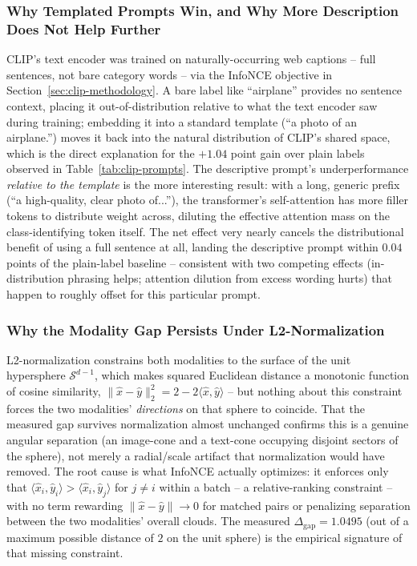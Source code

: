 \subsubsection{Why Templated Prompts Win, and Why More Description Does Not Help Further}

CLIP's text encoder was trained on naturally-occurring web captions --
full sentences, not bare category words -- via the InfoNCE objective in
Section~\ref{sec:clip-methodology}. A bare label like ``airplane'' provides no sentence context,
placing it out-of-distribution relative to what the text encoder saw
during training; embedding it into a standard template
(``a photo of an airplane.'') moves it back into the natural distribution
of CLIP's shared space, which is the direct explanation for the $+1.04$
point gain over plain labels observed in Table~\ref{tab:clip-prompts}. The
descriptive prompt's underperformance \emph{relative to the template} is
the more interesting result: with a long, generic prefix (``a
high-quality, clear photo of...''), the transformer's self-attention has
more filler tokens to distribute weight across, diluting the effective
attention mass on the class-identifying token itself. The net effect very
nearly cancels the distributional benefit of using a full sentence at all,
landing the descriptive prompt within $0.04$ points of the plain-label
baseline -- consistent with two competing effects (in-distribution
phrasing helps; attention dilution from excess wording hurts) that happen
to roughly offset for this particular prompt.

\subsubsection{Why the Modality Gap Persists Under L2-Normalization}

L2-normalization constrains both modalities to the surface of the unit
hypersphere $\mathcal{S}^{d-1}$, which makes squared Euclidean distance a
monotonic function of cosine similarity,
$\|\hat{x}-\hat{y}\|_2^2=2-2\langle\hat{x},\hat{y}\rangle$ -- but nothing
about this constraint forces the two modalities' \emph{directions} on that
sphere to coincide. That the measured gap survives normalization almost
unchanged confirms this is a genuine angular separation (an image-cone and
a text-cone occupying disjoint sectors of the sphere), not merely a
radial/scale artifact that normalization would have removed. The root
cause is what InfoNCE actually optimizes: it enforces only that
$\langle\hat{x}_i,\hat{y}_i\rangle>\langle\hat{x}_i,\hat{y}_j\rangle$ for
$j\neq i$ within a batch -- a relative-ranking constraint -- with no term
rewarding $\|\hat{x}-\hat{y}\|\to0$ for matched pairs or penalizing
separation between the two modalities' overall clouds. The measured
$\Delta_{\text{gap}}=1.0495$ (out of a maximum possible distance of $2$ on
the unit sphere) is the empirical signature of that missing constraint.

